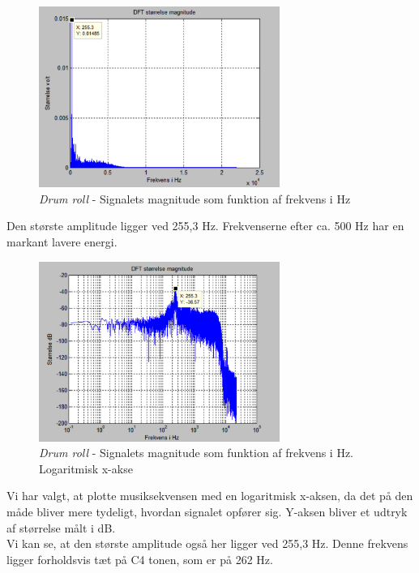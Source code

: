 \begin{figure}[H]
	\centering
	\includegraphics[width=0.7\textwidth]{Figurer/Snip20151001_14}
	\caption{\textit{Drum roll} - Signalets magnitude som funktion af frekvens i Hz}
\end{figure}

 Den største amplitude ligger ved 255,3 Hz. Frekvenserne efter ca. 500 Hz har en markant lavere energi.

\begin{figure}[H]
	\centering
	\includegraphics[width=0.7\textwidth]{Figurer/Snip20151001_12}
	\caption{\textit{Drum roll} - Signalets magnitude som funktion af frekvens i Hz. Logaritmisk x-akse}
\end{figure} 

Vi har valgt, at plotte musiksekvensen med en logaritmisk x-aksen, da det på den måde bliver mere tydeligt, hvordan signalet opfører sig. Y-aksen bliver et udtryk af størrelse målt i dB. \\
Vi kan se, at den største amplitude også her ligger ved 255,3 Hz. Denne frekvens ligger forholdsvis tæt på C4 tonen, som er på 262 Hz.   

